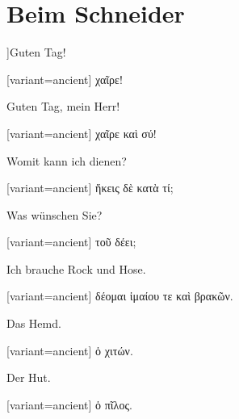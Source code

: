 \section{Beim Schneider}

]Guten Tag! 

\switchcolumn

\begin{greek}[variant=ancient]%
χαῖρε!

\end{greek}%
\switchcolumn*

Guten Tag, mein Herr! 

\switchcolumn

\begin{greek}[variant=ancient]%
χαῖρε καὶ σύ!

\end{greek}%
\switchcolumn*

Womit kann ich dienen? 

\switchcolumn

\begin{greek}[variant=ancient]%
ἥκεις δὲ κατὰ τί;

\end{greek}%
\switchcolumn*

Was wünschen Sie? 

\switchcolumn

\begin{greek}[variant=ancient]%
τοῦ δέει;

\end{greek}%
\switchcolumn*

Ich brauche Rock und Hose. 

\switchcolumn

\begin{greek}[variant=ancient]%
δέομαι ἱμαίου τε καὶ βρακῶν.

\end{greek}%
\switchcolumn*

Das Hemd. 

\switchcolumn

\begin{greek}[variant=ancient]%
ὁ χιτών.

\end{greek}%
\switchcolumn*

Der Hut. 

\switchcolumn

\begin{greek}[variant=ancient]%
ὁ πῖλος.

\end{greek}%
\switchcolumn*

